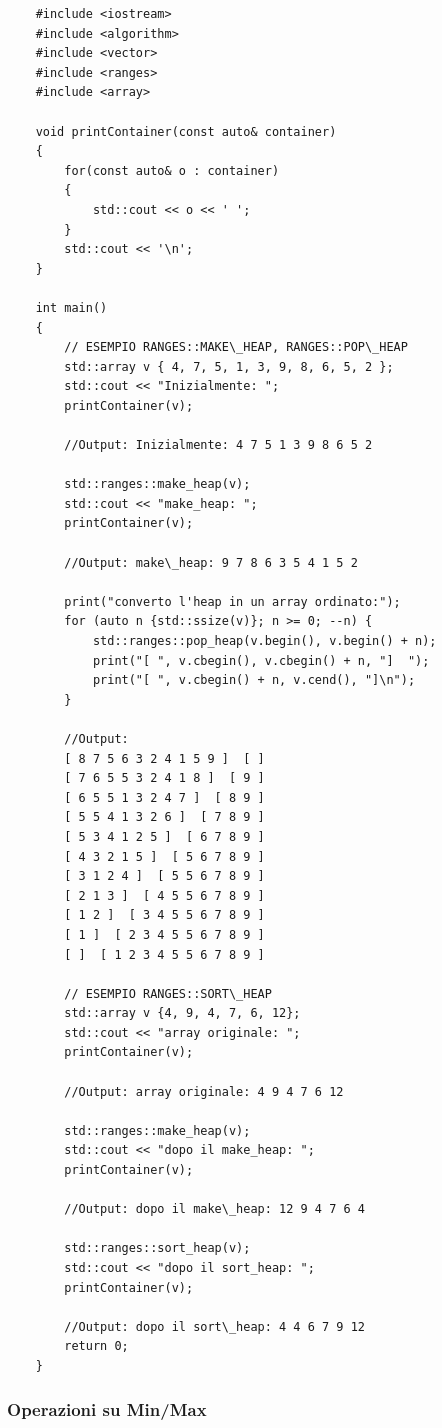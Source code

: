 \begin{lstlisting}
	#include <iostream>
	#include <algorithm>
	#include <vector>
	#include <ranges>
	#include <array>
	
	void printContainer(const auto& container)
	{
		for(const auto& o : container)
		{
			std::cout << o << ' ';
		}
		std::cout << '\n';
	}
	
	int main()
	{
		// ESEMPIO RANGES::MAKE\_HEAP, RANGES::POP\_HEAP
		std::array v { 4, 7, 5, 1, 3, 9, 8, 6, 5, 2 };
		std::cout << "Inizialmente: ";
		printContainer(v);
		
		//Output: Inizialmente: 4 7 5 1 3 9 8 6 5 2
		
		std::ranges::make_heap(v);
		std::cout << "make_heap: ";
		printContainer(v);
		
		//Output: make\_heap: 9 7 8 6 3 5 4 1 5 2
		
		print("converto l'heap in un array ordinato:");
		for (auto n {std::ssize(v)}; n >= 0; --n) {
			std::ranges::pop_heap(v.begin(), v.begin() + n);
			print("[ ", v.cbegin(), v.cbegin() + n, "]  ");
			print("[ ", v.cbegin() + n, v.cend(), "]\n");
		}
		
		//Output:
		[ 8 7 5 6 3 2 4 1 5 9 ]  [ ]
		[ 7 6 5 5 3 2 4 1 8 ]  [ 9 ]
		[ 6 5 5 1 3 2 4 7 ]  [ 8 9 ]
		[ 5 5 4 1 3 2 6 ]  [ 7 8 9 ]
		[ 5 3 4 1 2 5 ]  [ 6 7 8 9 ]
		[ 4 3 2 1 5 ]  [ 5 6 7 8 9 ]
		[ 3 1 2 4 ]  [ 5 5 6 7 8 9 ]
		[ 2 1 3 ]  [ 4 5 5 6 7 8 9 ]
		[ 1 2 ]  [ 3 4 5 5 6 7 8 9 ]
		[ 1 ]  [ 2 3 4 5 5 6 7 8 9 ]
		[ ]  [ 1 2 3 4 5 5 6 7 8 9 ]
		
		// ESEMPIO RANGES::SORT\_HEAP
		std::array v {4, 9, 4, 7, 6, 12};
		std::cout << "array originale: ";
		printContainer(v);
		
		//Output: array originale: 4 9 4 7 6 12
		
		std::ranges::make_heap(v);
		std::cout << "dopo il make_heap: ";
		printContainer(v);
		
		//Output: dopo il make\_heap: 12 9 4 7 6 4 
		
		std::ranges::sort_heap(v);
		std::cout << "dopo il sort_heap: ";
		printContainer(v);
		
		//Output: dopo il sort\_heap: 4 4 6 7 9 12
		return 0;
	}
\end{lstlisting}

\subsubsection{Operazioni su Min/Max}

\label{ranges_min_max}

